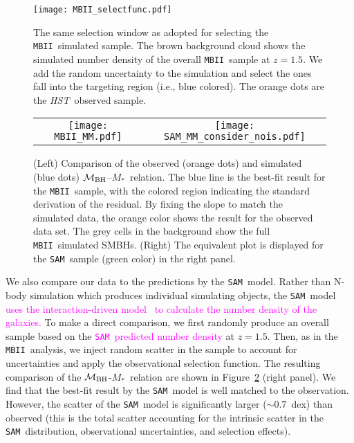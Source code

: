 \documentclass[twocolumn,trackchanges]{aastex63}
\newcommand{\hst}{{\it HST}}
\newcommand{\mbh}{$\mathcal M_{\rm BH}$}
\newcommand{\mstar}{{$M_*$}}
\newcommand{\sam}{\texttt{SAM}}
\newcommand{\mbii}{\texttt{MBII}}
\newcommand{\pink}[1]{{ \textcolor{magenta}{#1}}}
\begin{document}
\begin{figure}[t]
\texttt{[image: MBII\_selectfunc.pdf]}
\caption{The same selection window as adopted for selecting the \mbii\ simulated sample. The brown background cloud shows the simulated number density of the overall \mbii\ sample at $z=1.5$. We add the random uncertainty to the simulation and select the ones fall into the targeting region (i.e., blue colored). The orange dots are the \hst\ observed sample.}
\label{fig:selectfunc}
\end{figure}

\begin{figure*}[t]%
\begin{tabular}{c c}
\texttt{[image: MBII\_MM.pdf]} &
\texttt{[image: SAM\_MM\_consider\_nois.pdf]} \\
\end{tabular}
\caption{(Left) Comparison of the observed (orange dots) and simulated (blue dots) \mbh--\mstar\ relation. The blue line is the best-fit result for the \mbii\ sample, with the colored region indicating the standard derivation of the residual. By fixing the slope to match the simulated data, the orange color shows the result for the observed data set. The grey cells in the background show the full \mbii\ simulated SMBHs. (Right) The equivalent plot is displayed for the \sam\ sample (green color) in the right panel.}
\label{fig:MM_comp}
\end{figure*}

We also compare our data to the predictions by the \sam\ model. Rather than N-body simulation which produces individual simulating objects, the \sam\ model\pink{uses the interaction-driven model~\citep{Menci2014} to calculate the number density of the galaxies.} To make a direct comparison, we first randomly produce an overall sample based on the \pink{\sam\ predicted number density} at $z=1.5$. Then, as in the \mbii\ analysis, we inject random scatter in the sample to account for uncertainties and apply the observational selection function. The resulting comparison of the  \mbh-\mstar\ relation are shown in Figure~\ref{fig:MM_comp} (right panel). We find that the best-fit result by the \sam\ model is well matched to the observation. However, the scatter of the \sam\ model is significantly larger ($\sim0.7$~dex) than observed (this is the total scatter accounting for the intrinsic scatter in the \sam\ distribution, observational uncertainties, and selection effects).  
\end{document}
